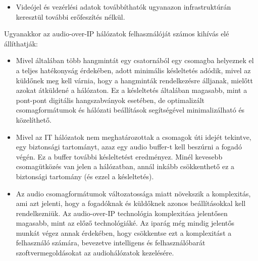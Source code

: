 \begin{itemize}
	\item Videójel és vezérlési adatok továbbíthatók ugyanazon infrastruktúrán
	      keresztül további erőfeszítés nélkül.
\end{itemize}
Ugyanakkor az audio-over-IP hálózatok felhasználóját számos kihívás elé
állíthatják:

\begin{itemize}
	\item Mivel általában több hangmintát egy csatornából egy csomagba helyeznek
	      el a teljes hatékonyság érdekében, adott minimális késleltetés adódik, mivel az
	      küldőnek meg kell várnia, hogy a hangminták rendelkezésre álljanak, mielőtt
	      azokat átküldené a hálózaton. Ez a késleltetés általában magasabb, mint a
	      pont-pont digitális hangszabványok esetében, de optimalizált csomagformátumok és
	      hálózati beállítások segítségével minimalizálható és közelíthető.
\end{itemize}


\begin{itemize}
	\item Mivel az IT hálózatok nem meghatározottak a csomagok úti idejét tekintve,
	      egy biztonsági tartományt, azaz egy audio buffer-t kell beszúrni a fogadó végén.
	      Ez a buffer további késleltetést eredményez. Minél kevesebb csomagütközés van
	      jelen a hálózatban, annál inkább csökkenthető ez a biztonsági tartomány (és
	      ezzel a késleltetés).
\end{itemize}


\begin{itemize}
	\item Az audio csomagformátumok változatossága miatt növekszik a komplexitás,
	      ami azt jelenti, hogy a fogadóknak és küldőknek azonos beállításokkal kell
	      rendelkezniük. Az audio-over-IP technológia komplexitása jelentősen magasabb,
	      mint az előző technológiáké. Az iparág még mindig jelentős munkát végez annak
	      érdekében, hogy csökkentse ezt a komplexitást a felhasználó számára, bevezetve
	      intelligens és felhasználóbarát szoftvermegoldásokat az audiohálózatok
	      kezelésére.
\end{itemize}








